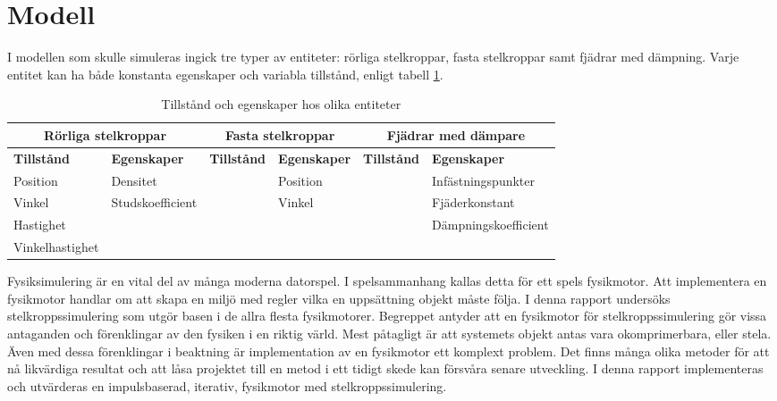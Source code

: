\documentclass[a4paper,12pt,twopage,swedish]{article}
\begin{document}

\section{Modell}
I modellen som skulle simuleras ingick tre typer av entiteter: rörliga stelkroppar, fasta stelkroppar samt fjädrar med dämpning. Varje entitet kan ha både konstanta egenskaper och variabla tillstånd, enligt tabell \ref{table:states_and_properties}.

\begin{table}[!htp]
	\caption{Tillstånd och egenskaper hos olika entiteter}
	\label{table:states_and_properties}
	\renewcommand{\arraystretch}{1.5}
	\begin{tabular}{|p{1cm}|p{1cm}|p{1cm}|p{1cm}|p{1cm}|p{1cm}|}
		\hline
			\multicolumn{2}{|c|}{\textbf{Rörliga stelkroppar}} & \multicolumn{2}{|c|}{\textbf{Fasta stelkroppar}} & \multicolumn{2}{|c|}{\textbf{Fjädrar med dämpare}} \\
		\hline
			\textbf{Tillstånd} & \textbf{Egenskaper} & \textbf{Tillstånd} & \textbf{Egenskaper} & \textbf{Tillstånd} & \textbf{Egenskaper} \\
		\hline
			Position & Densitet & & Position & & Infästnings\-punkter \\
			Vinkel & Studs\-koefficient & & Vinkel & & Fjäder\-konstant \\
			Hastighet & & & & & Dämpnings\-koefficient \\
			Vinkel\-hastighet & & & & & {} \\
		\hline
	\end{tabular}
\end{table}












\clearpage \clearpage
Fysiksimulering  är en vital del av många moderna datorspel. I spelsammanhang kallas detta för ett spels fysikmotor. Att implementera en fysikmotor handlar om att skapa en miljö med regler vilka en uppsättning objekt måste följa. I denna rapport undersöks stelkroppssimulering som utgör basen i de allra flesta fysikmotorer. Begreppet antyder att en fysikmotor för stelkroppssimulering gör vissa antaganden och förenklingar av den fysiken i en riktig värld. Mest påtagligt är att systemets objekt antas vara okomprimerbara, eller stela. Även med dessa förenklingar i beaktning är implementation av en fysikmotor ett komplext problem. Det finns många olika metoder för att nå likvärdiga resultat och att låsa projektet till en metod i ett tidigt skede kan försvåra senare utveckling. I denna rapport implementeras och utvärderas en impulsbaserad, iterativ, fysikmotor med stelkroppssimulering.
\end{document}
